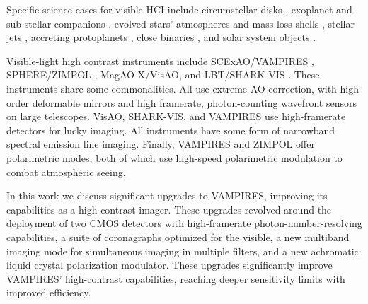 Specific science cases for visible HCI include circumstellar disks \citep{benisty_optical_2022}, exoplanet and sub-stellar companions \citep{hunziker_refplanets_2020}, evolved stars' atmospheres and mass-loss shells \citep{norris_vampires_2015}, stellar jets \citep{schmid_spherezimpol_2017,uyama_monitoring_2022}, accreting protoplanets \citep{uyama_high-contrast_2020,benisty_circumplanetary_2021}, close binaries \citep{mcclure_binary_1980,escorza_barium_2019}, and solar system objects \citep{schmid_limb_2006,vernazza_vltsphere_2021}.

Visible-light high contrast instruments include SCExAO/VAMPIRES \citep{norris_vampires_2015}, SPHERE/ZIMPOL \citep{schmid_spherezimpol_2018}, MagAO-X/VisAO, and LBT/SHARK-VIS \citep{mattioli_shark-vis_2018}. These instruments share some commonalities. All use extreme AO correction, with high-order deformable mirrors and high framerate, photon-counting wavefront sensors on large telescopes. VisAO, SHARK-VIS, and VAMPIRES use high-framerate detectors for lucky imaging. All instruments have some form of narrowband spectral emission line imaging. Finally, VAMPIRES and ZIMPOL offer polarimetric modes, both of which use high-speed polarimetric modulation to combat atmospheric seeing.

In this work we discuss significant upgrades to VAMPIRES, improving its capabilities as a high-contrast imager. These upgrades revolved around the deployment of two CMOS detectors with high-framerate photon-number-resolving capabilities, a suite of coronagraphs optimized for the visible, a new multiband imaging mode for simultaneous imaging in multiple filters, and a new achromatic liquid crystal polarization modulator. These upgrades significantly improve VAMPIRES' high-contrast capabilities, reaching deeper sensitivity limits with improved efficiency.
